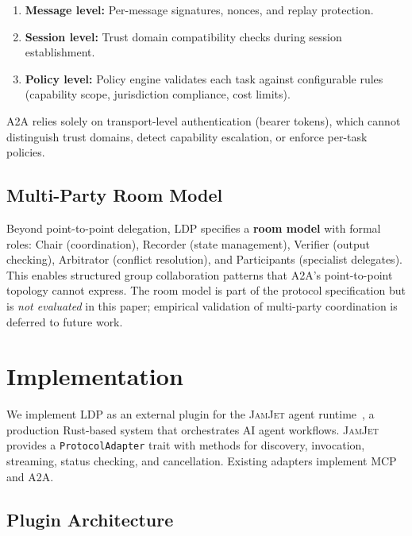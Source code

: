 \documentclass[11pt,a4paper]{article}
\newcommand{\ldp}{\textsc{LDP}}
\newcommand{\atoa}{\textsc{A2A}}
\newcommand{\mcp}{\textsc{MCP}}
\newcommand{\jamjet}{\textsc{JamJet}}
\begin{document}
\begin{enumerate}[leftmargin=*]
\item \textbf{Message level:} Per-message signatures, nonces, and replay protection.
\item \textbf{Session level:} Trust domain compatibility checks during session establishment.
\item \textbf{Policy level:} Policy engine validates each task against configurable rules (capability scope, jurisdiction compliance, cost limits).
\end{enumerate}

\atoa{} relies solely on transport-level authentication (bearer tokens), which cannot distinguish trust domains, detect capability escalation, or enforce per-task policies.

\subsection{Multi-Party Room Model}

Beyond point-to-point delegation, \ldp{} specifies a \textbf{room model} with formal roles: Chair (coordination), Recorder (state management), Verifier (output checking), Arbitrator (conflict resolution), and Participants (specialist delegates). This enables structured group collaboration patterns that \atoa{}'s point-to-point topology cannot express. The room model is part of the protocol specification but is \emph{not evaluated} in this paper; empirical validation of multi-party coordination is deferred to future work.


\section{Implementation}
\label{sec:implementation}

We implement \ldp{} as an external plugin for the \jamjet{} agent runtime~\citep{jamjet2024}, a production Rust-based system that orchestrates AI agent workflows. \jamjet{} provides a \texttt{ProtocolAdapter} trait with methods for discovery, invocation, streaming, status checking, and cancellation. Existing adapters implement \mcp{} and \atoa{}.

\subsection{Plugin Architecture}
\end{document}
